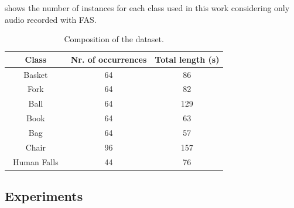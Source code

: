  shows the number of instances for each class used in this work considering only audio recorded with FAS. 

\begin{table}[htb]
	\caption{Composition  of the dataset.}
	\label{tab:numDataset_few_shot}
	\begin{center}
		\begin{tabular}[htb]{c|c|c}	
			\hline
			\textbf{Class} & \textbf{Nr. of occurrences} & \textbf{Total length (s)} \\ %
			\hline
			Basket      			& 64    &   86    	\\
			Fork        			& 64    &   82     	\\
			Ball       				& 64    &   129     \\
			Book        			& 64    &   63    	\\
			Bag         			& 64    &   57     	\\
			Chair       			& 96    &   157     \\
			$\,$ Human Falls $\,$ 	& 44    &   76     	\\
			\hline
		\end{tabular}
	\end{center}
\end{table}


\subsection{Experiments}
\label{sec:experiments}


